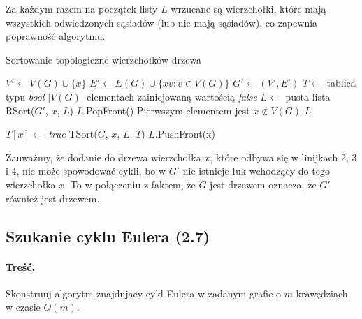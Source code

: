 Za każdym razem na początek listy $L$ wrzucane są wierzchołki, 
które mają wszystkich odwiedzonych sąsiadów (lub nie mają sąsiadów),
co zapewnia poprawność algorytmu.

\begin{algorithm}[H]
	\caption{Sortowanie topologiczne wierzchołków drzewa}
	\begin{algorithmic}[1]
		\State $V' \gets V(G) \cup \{x\}$
		\State $E' \gets E(G) \cup \{xv : v \in V(G)\}$
		\State $G' \gets (V', E')$
		\State $T \gets$ tablica typu \textit{bool} $|V(G)|$ elementach zainicjowaną wartością 
		\textit{false}
		\State $L \gets$ pusta lista
		\State RSort($G'$, $x$, $L$)
		\State $L$.PopFront() \Comment Pierwszym elementem jest $x \not \in V(G)$
		\State \Return $L$
		\EndProcedure
		
		\State $T[x] \gets$ \textit{true}
		\State TSort($G$, $x$, $L$, $T$)
		\EndIf
		\EndWhile
		\State $L$.PushFront(x)
		\EndProcedure
	\end{algorithmic}
	\label{alg:Zadanie26}
\end{algorithm}

Zauważmy, że dodanie do drzewa wierzchołka $x$, które odbywa się w linijkach 2, 3 i 4, nie może spowodować
cykli, bo w $G'$ nie istnieje łuk wchodzący do tego wierzchołka $x$. To w połączeniu z faktem, 
że $G$ jest drzewem oznacza, że $G'$ również jest drzewem.

\subsection{Szukanie cyklu Eulera (2.7)}
\paragraph{Treść.} Skonstruuj algorytm znajdujący cykl Eulera 
w zadanym grafie o $m$ krawędziach w czasie $O(m)$.

